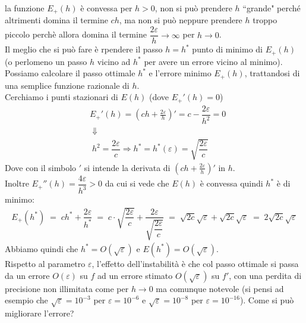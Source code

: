 \documentclass[12pt,a4paper]{article}
\begin{document}
la funzione $E_+(h)$ è convessa per $h>0$, non si può prendere $h$ ``grande" perché altrimenti domina il termine $ch$, ma
non si può neppure prendere $h$ troppo piccolo perchè allora domina il termine $\dfrac{2\varepsilon}{h}\to \infty$ per $h\to 0$.\\
Il meglio che si può fare è rpendere il passo $h=h^*$ punto di minimo di $E_+(h)$ (o perlomeno un passo $h$ vicino ad $h^*$ per avere un errore vicino al minimo).\\
Possiamo calcolare il passo ottimale $h^*$ e l'errore minimo $E_+(h)$, trattandosi di una semplice funzione razionale di $h$.\\
Cerchiamo i punti stazionari di $E(h)$ (dove $E_+'(h)=0$)
\[ \begin{split}
	& E_+'(h)=\left( ch+\frac{2\varepsilon}{h}\right) ' =c-\dfrac{2\varepsilon}{h^2}=0 \\
	& \; \Downarrow \\
	& \; h^2=\dfrac{2\varepsilon}{c}\Rightarrow h^*=h^*(\varepsilon)=\sqrt{\dfrac{2\varepsilon}{c}}
\end{split} \]
Dove con il simbolo $'$ si intende la derivata di $\left( ch+\frac{2\varepsilon}{h}\right) '$ in $h$.\\
Inoltre $E_+''(h)=\dfrac{4\varepsilon}{h^3}>0$ da cui si vede che $E(h)$ è convessa quindi $h^*$ è di minimo:
\[ \begin{split}
	E_+(h^*) \; = \; ch^* + \dfrac{2\varepsilon}{h^*} \; = \; c\cdot \sqrt{\dfrac{2\varepsilon}{c}} + \dfrac{2\varepsilon}{\sqrt{\dfrac{2\varepsilon}{c}}} \; = \; \sqrt{2c} \sqrt{\varepsilon} + \sqrt{2c} \sqrt{\varepsilon} \; = \; 2 \sqrt{2c} \sqrt{\varepsilon}
\end{split} \]
Abbiamo quindi che $h^*=O(\sqrt{\varepsilon})$ e $E(h^*)=O(\sqrt{\varepsilon})$.\\
Rispetto al parametro $\varepsilon$, l'effetto dell'instabilità è che col passo ottimale si passa da un errore $O(\varepsilon)$ su $f$ ad un errore stimato $O(\sqrt{\varepsilon})$ su $f'$, con una perdita di precisione non illimitata come per $h\to 0$ ma comunque notevole (si pensi ad esempio che $\sqrt{\varepsilon}=10^{-3}$ per $\varepsilon=10^{-6}$ e $\sqrt{\varepsilon}=10^{-8}$ per $\varepsilon=10^{-16}$).
Come si può migliorare l'errore?\\
\end{document}
